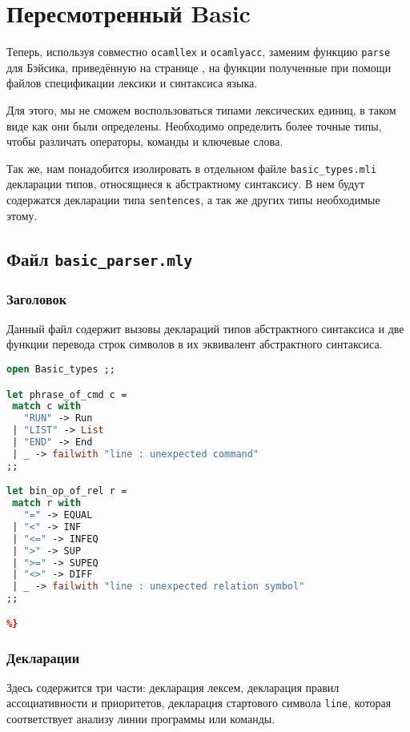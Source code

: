 \section{Пересмотренный Basic}

Теперь, используя совместно \texttt{ocamllex} и \texttt{ocamlyacc}, заменим
функцию \texttt{parse} для Бэйсика, приведённую на странице \pageref{??}, на
функции полученные при помощи файлов спецификации лексики и синтаксиса языка.

Для этого, мы не сможем воспользоваться типами лексических единиц, в таком виде
как они были определены. Необходимо определить более точные типы, чтобы
различать операторы, команды и ключевые слова.

Так же, нам понадобится изолировать в отдельном файле \texttt{basic\_types.mli}
декларации типов, относящиеся к абстрактному синтаксису. В нем будут содержатся
декларации типа \texttt{sentences}, а так же других типы необходимые этому.

\subsection{Файл \texttt{basic\_parser.mly}}

\subsubsection{Заголовок}

Данный файл содержит вызовы деклараций типов абстрактного синтаксиса и две
функции перевода строк символов в их эквивалент абстрактного синтаксиса.

\begin{lstlisting}[language=OCaml]
%{
open Basic_types ;;

let phrase_of_cmd c =
 match c with
   "RUN" -> Run
 | "LIST" -> List
 | "END" -> End
 | _ -> failwith "line : unexpected command"
;;

let bin_op_of_rel r =
 match r with
   "=" -> EQUAL
 | "<" -> INF
 | "<=" -> INFEQ
 | ">" -> SUP
 | ">=" -> SUPEQ
 | "<>" -> DIFF
 | _ -> failwith "line : unexpected relation symbol"
;;

%}
\end{lstlisting}

\subsubsection{Декларации}

Здесь содержится три части: декларация лексем, декларация правил ассоциативности
и приоритетов, декларация стартового символа \texttt{line}, которая
соответствует анализу линии программы или команды.

